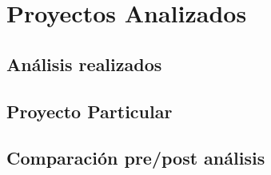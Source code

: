 \section{Proyectos Analizados}

\subsection{Análisis realizados}
\subsection{Proyecto Particular}
\subsection{Comparación pre/post análisis}
